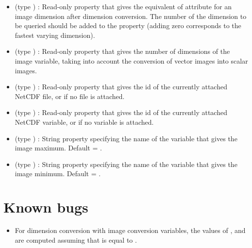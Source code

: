\begin{itemize}
\item {} (type ) : Read-only
property that gives the equivalent of attribute  for an
image dimension after dimension conversion. The number of the
dimension to be queried should be added to the property (adding zero
corresponds to the fastest varying dimension). 

\item {} (type ) : Read-only property
that gives the number of dimensions of the image variable, taking into
account the conversion of vector images into scalar images.

\item {} (type ) : Read-only property
that gives the id of the currently attached NetCDF file, or
 if no file is attached.

\item {} (type ) : Read-only property
that gives the id of the currently attached NetCDF variable, or
 if no variable is attached.

\item {} (type ) : String property
specifying the name of the variable that gives the image maximum. 
Default = . 

\item {} (type ) : String property
specifying the name of the variable that gives the image minimum. 
Default = .

\end{itemize}

\section{Known bugs}

\begin{itemize}

\item For dimension conversion with image conversion variables, the
values of ,  and
 are computed assuming that
 is equal to . 

\end{itemize}




